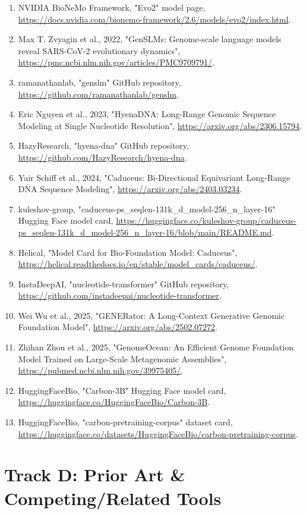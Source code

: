 \documentclass[11pt]{report}
\begin{document}
\begin{enumerate}
\item NVIDIA BioNeMo Framework, "Evo2" model page, \url{https://docs.nvidia.com/bionemo-framework/2.6/models/evo2/index.html}.
\item Max T. Zvyagin et al., 2022, "GenSLMs: Genome-scale language models reveal SARS-CoV-2 evolutionary dynamics", \url{https://pmc.ncbi.nlm.nih.gov/articles/PMC9709791/}.
\item ramanathanlab, "genslm" GitHub repository, \url{https://github.com/ramanathanlab/genslm}.
\item Eric Nguyen et al., 2023, "HyenaDNA: Long-Range Genomic Sequence Modeling at Single Nucleotide Resolution", \url{https://arxiv.org/abs/2306.15794}.
\item HazyResearch, "hyena-dna" GitHub repository, \url{https://github.com/HazyResearch/hyena-dna}.
\item Yair Schiff et al., 2024, "Caduceus: Bi-Directional Equivariant Long-Range DNA Sequence Modeling", \url{https://arxiv.org/abs/2403.03234}.
\item kuleshov-group, "caduceus-ps\_seqlen-131k\_d\_model-256\_n\_layer-16" Hugging Face model card, \url{https://huggingface.co/kuleshov-group/caduceus-ps_seqlen-131k_d_model-256_n_layer-16/blob/main/README.md}.
\item Helical, "Model Card for Bio-Foundation Model: Caduceus", \url{https://helical.readthedocs.io/en/stable/model_cards/caduceus/}.
\item InstaDeepAI, "nucleotide-transformer" GitHub repository, \url{https://github.com/instadeepai/nucleotide-transformer}.
\item Wei Wu et al., 2025, "GENERator: A Long-Context Generative Genomic Foundation Model", \url{https://arxiv.org/abs/2502.07272}.
\item Zhihan Zhou et al., 2025, "GenomeOcean: An Efficient Genome Foundation Model Trained on Large-Scale Metagenomic Assemblies", \url{https://pubmed.ncbi.nlm.nih.gov/39975405/}.
\item HuggingFaceBio, "Carbon-3B" Hugging Face model card, \url{https://huggingface.co/HuggingFaceBio/Carbon-3B}.
\item HuggingFaceBio, "carbon-pretraining-corpus" dataset card, \url{https://huggingface.co/datasets/HuggingFaceBio/carbon-pretraining-corpus}.
\end{enumerate}

\chapter{Track D: Prior Art \& Competing/Related Tools}
\end{document}
